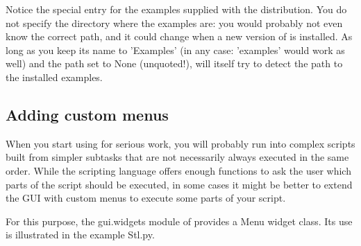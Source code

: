 Notice the special entry for the examples supplied with the distribution. You do not specify the directory where the examples are: you would probably not even know the correct path, and it could change when a new version of \pyf is installed. As long as you keep its name to 'Examples' (in any case: 'examples' would work as well) and the path set to None (unquoted!), \pyformex will itself try to detect the path to the installed examples. 


\subsection{Adding custom menus}
\label{sec:adding-custom-menus}

When you start using \pyformex for serious work, you will probably run into complex scripts built from simpler subtasks that are not necessarily always executed in the same order. While the \pyformex scripting language offers enough functions to ask the user which parts of the script should be executed, in some cases it might be better to extend the \pyformex GUI with custom menus to execute some parts of your script.

For this purpose, the gui.widgets module of \pyformex provides a Menu widget class. Its use is illustrated in the example Stl.py.

